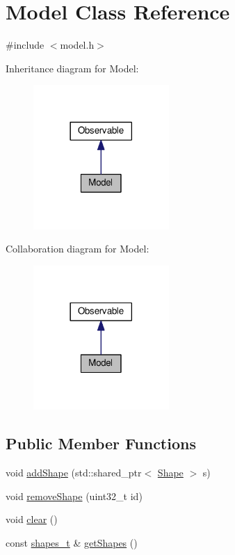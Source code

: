 \hypertarget{class_model}{\section{Model Class Reference}
\label{class_model}
}


{\ttfamily \#include $<$model.\-h$>$}



Inheritance diagram for Model\-:
\nopagebreak
\begin{figure}[H]
\begin{center}
\leavevmode
\includegraphics[width=146pt]{class_model__inherit__graph}
\end{center}
\end{figure}


Collaboration diagram for Model\-:
\nopagebreak
\begin{figure}[H]
\begin{center}
\leavevmode
\includegraphics[width=146pt]{class_model__coll__graph}
\end{center}
\end{figure}
\subsection*{Public Member Functions}
\begin{DoxyCompactItemize}
\item 
void \hyperlink{class_model_a3484c3b12fd36cfad3a747da1f7836a6}{add\-Shape} (std\-::shared\-\_\-ptr$<$ \hyperlink{class_shape}{Shape} $>$ s)
\item 
void \hyperlink{class_model_ad606d11bbdc31559c1c31e42c739deb8}{remove\-Shape} (uint32\-\_\-t id)
\item 
void \hyperlink{class_model_a7b8102ec95ed8796b01501bf054a3330}{clear} ()
\item 
const \hyperlink{model_8h_a20f87b4e5f8cd3bd25dffa8e90e1340c}{shapes\-\_\-t} \& \hyperlink{class_model_aefac93c7d48c75209a496e24fa67b1b7}{get\-Shapes} ()
\end{DoxyCompactItemize}


